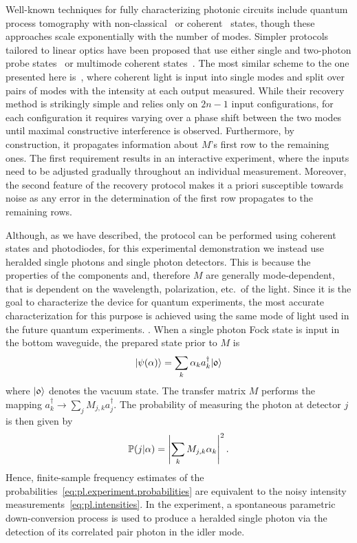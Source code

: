Well-known techniques for fully characterizing photonic circuits include quantum process tomography with non-classical~\cite{Brien_2004_Quantum} or coherent~\cite{Keshari_2011_Quantum} states, though these approaches scale exponentially with the number of modes.
Simpler protocols tailored to linear optics have been proposed that use either single and two-photon probe states~\cite{Laing_2012_SuperStable,Dhand_2016_Accurate,Spagnolo_2017_Learning} or multimode coherent states~\cite{Keshari_2013_Direct,Tillmann_2016_On}.
The most similar scheme to the one presented here is~\cite{Keshari_2013_Direct}, where coherent light is input into single modes and split over pairs of modes with the intensity at each output measured.
While their recovery method is strikingly simple and relies only on $2n-1$ input configurations, for each configuration it requires varying over a phase shift between the two modes until maximal constructive interference is observed.
Furthermore, by construction, it propagates information about ${M}$'s first row to the remaining ones.
The first requirement results in an interactive experiment, where the inputs need to be adjusted gradually throughout an individual measurement.
Moreover, the second feature of the recovery protocol makes it a priori susceptible towards noise as any error in the determination of the first row propagates to the remaining rows.

Although, as we have described, the protocol can be performed using coherent states and photodiodes, for this experimental demonstration we instead use heralded single photons and single photon detectors.
This is because the properties of the components and, therefore $ M$ are generally mode-dependent, that is dependent on the wavelength, polarization, etc.\ of the light.
Since it is the goal to characterize the device for quantum experiments, the most accurate characterization for this purpose is achieved using the same mode of light used in the future quantum experiments. .
When a single photon Fock state is input in the bottom waveguide, the prepared state prior to $ M$ is
\[
  \ket{\psi({\alpha})} = \sum_k \alpha_k a_k^{\dag} \ket{\mathfrak{0}}
\]
where $\ket{\mathfrak{0}}$ denotes the vacuum state.
The transfer matrix $M$ performs the mapping $a_k^{\dag} \rightarrow \sum_j M_{j,k}a_j^{\dag}$.
The probability of measuring the photon at detector $j$ is then given by
\[
  \mathbb{P}(j|{\alpha}) = \left| \sum_k M_{j,k} \alpha_k \right|^2.
  \label{eq:pl.experiment.probabilities}
\]
Hence, finite-sample frequency estimates of the probabilities~\eqref{eq:pl.experiment.probabilities} are equivalent to the noisy intensity measurements~\eqref{eq:pl.intensities}.
In the experiment, a spontaneous parametric down-conversion process is used to produce a heralded single photon via the detection of its correlated pair photon in the idler mode.

